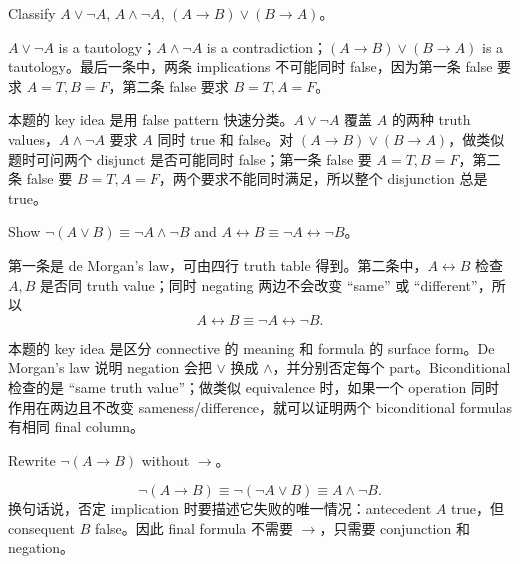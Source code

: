 \begin{exerciseblock}
Classify \(A\lor\lnot A\), \(A\land\lnot A\), \((A\to B)\lor(B\to A)\)。
\end{exerciseblock}

\begin{solution}
\(A\lor\lnot A\) is a tautology；\(A\land\lnot A\) is a contradiction；\((A\to B)\lor(B\to A)\) is a tautology。最后一条中，两条 implications 不可能同时 false，因为第一条 false 要求 \(A=T,B=F\)，第二条 false 要求 \(B=T,A=F\)。
\end{solution}

\begin{explanation}
本题的 key idea 是用 false pattern 快速分类。\(A\lor\lnot A\) 覆盖 \(A\) 的两种 truth values，\(A\land\lnot A\) 要求 \(A\) 同时 true 和 false。对 \((A\to B)\lor(B\to A)\)，做类似题时可问两个 disjunct 是否可能同时 false；第一条 false 要 \(A=T,B=F\)，第二条 false 要 \(B=T,A=F\)，两个要求不能同时满足，所以整个 disjunction 总是 true。
\end{explanation}

\begin{exerciseblock}
Show \(\lnot(A\lor B)\equiv\lnot A\land\lnot B\) and \(A\leftrightarrow B\equiv\lnot A\leftrightarrow\lnot B\)。
\end{exerciseblock}

\begin{solution}
第一条是 de Morgan's law，可由四行 truth table 得到。第二条中，\(A\leftrightarrow B\) 检查 \(A,B\) 是否同 truth value；同时 negating 两边不会改变 ``same'' 或 ``different''，所以
\[
A\leftrightarrow B\equiv\lnot A\leftrightarrow\lnot B.
\]
\end{solution}

\begin{explanation}
本题的 key idea 是区分 connective 的 meaning 和 formula 的 surface form。De Morgan's law 说明 negation 会把 \(\lor\) 换成 \(\land\)，并分别否定每个 part。Biconditional 检查的是 ``same truth value''；做类似 equivalence 时，如果一个 operation 同时作用在两边且不改变 sameness/difference，就可以证明两个 biconditional formulas 有相同 final column。
\end{explanation}

\begin{exerciseblock}
Rewrite \(\lnot(A\to B)\) without \(\to\)。
\end{exerciseblock}

\begin{solution}
\[
\lnot(A\to B)\equiv\lnot(\lnot A\lor B)\equiv A\land\lnot B.
\]
换句话说，否定 implication 时要描述它失败的唯一情况：antecedent \(A\) true，但 consequent \(B\) false。因此 final formula 不需要 \(\to\)，只需要 conjunction 和 negation。
\end{solution}

